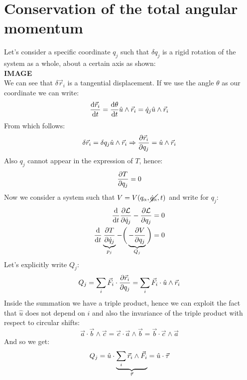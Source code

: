 \section{Conservation of the total angular momentum}
Let's consider a specific coordinate $q_j$ such that $\delta q_j$ is a rigid rotation of the system as a whole, about a certain axis as shown:
\\\textbf{IMAGE}\\
We can see that $\delta \vec{r}_i$ is a tangential displacement. If we use the angle $\theta$ as our coordinate we can write:
\begin{equation}
    \dv{\vec{r}_i}{t} = \dv{\theta}{t} \hat{u} \wedge \vec{r}_i = \dot{q}_j \hat{u} \wedge \vec{r}_i
\end{equation}
From which follows:
\begin{equation}
    \delta \vec{r}_i = \delta q_j \hat{u} \wedge \vec{r}_i \Rightarrow \pdv{\vec{r}_i}{q_j} = \hat{u} \wedge \vec{r}_i
\end{equation}
Also $q_j$ cannot appear in the expression of $T$, hence:
\begin{equation}
    \pdv{T}{q_j} = 0
\end{equation}
Now we consider a system such that $V = V(q_{\alpha},\cancel{\dot{q}_{\alpha}},t)$ and write \eleref\;for $q_j$:
\begin{equation} \label{e:ele_for_angular_momentum}
    \begin{split}
        \dv{}{t}\pdv{\lagr}{\dot{q}_j} - \pdv{\lagr}{q_j} = 0\\
        \dv{}{t}\underbrace{\pdv{T}{\dot{q}_j}}_{p_j} - \bigg(\underbrace{- \pdv{V}{q_j}}_{Q_j}\bigg) = 0
    \end{split}
\end{equation}
Let's explicitly write $Q_j$:
\begin{equation}
    Q_j = \bigsum_i \vec{F}_i \cdot \pdv{\vec{r}_i}{q_j} = \bigsum_i \vec{F}_i \cdot \hat{u} \wedge \vec{r}_i
\end{equation}
Inside the summation we have a triple product, hence we can exploit the fact that $\hat{u}$ does not depend on $i$ and also the invariance of the triple product with respect to circular shifts:
\begin{equation}
    \vec{a} \cdot \vec{b} \wedge \vec{c} = \vec{c} \cdot \vec{a} \wedge \vec{b} = \vec{b} \cdot \vec{c} \wedge \vec{a}
\end{equation}
And so we get:
\begin{equation}
    Q_j = \hat{u} \cdot \underbrace{\displaystyle\sum_i \vec{r}_i \wedge \vec{F}_i}_{\vec{\tau}} = \hat{u} \cdot \vec{\tau}
\end{equation}
